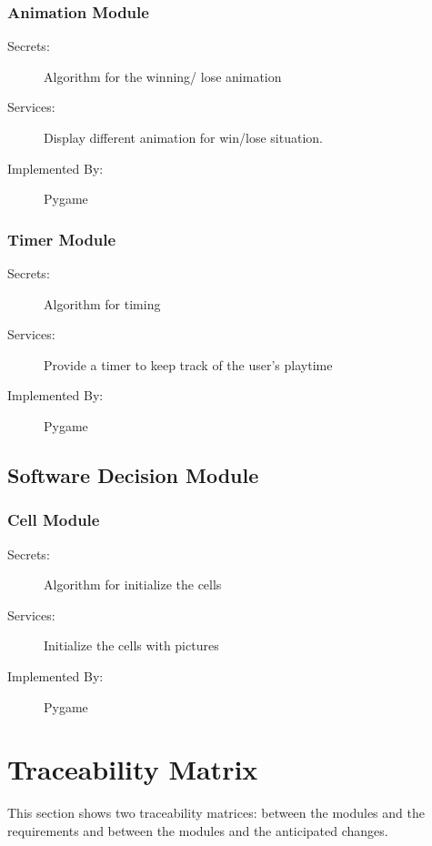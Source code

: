 \documentclass[12pt, titlepage]{article}
\begin{document}
\subsubsection{Animation Module}
\begin{description}
\item[Secrets:]Algorithm for the winning/ lose animation
\item[Services:] Display different animation for win/lose situation.
\item[Implemented By:] Pygame
\end{description}

\subsubsection{Timer Module}
\begin{description}
\item[Secrets:] Algorithm for timing 
\item[Services:] Provide a timer to keep track of the user's playtime
\item[Implemented By:] Pygame
\end{description}

\subsection{Software Decision Module}

\subsubsection{Cell Module}
\begin{description}
\item[Secrets:]Algorithm for initialize the cells
\item[Services:] Initialize the cells with pictures
\item[Implemented By:] Pygame
\end{description}

\newpage
\section{Traceability Matrix} \label{SecTM}

This section shows two traceability matrices: between the modules and the
requirements and between the modules and the anticipated changes.
\end{document}

